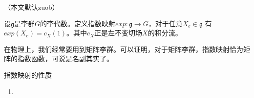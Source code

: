 
（本文默认zuob）
\begin{definition}{}
设$\mathfrak g$是李群$G$的李代数。定义指数映射$exp:\mathfrak g\to G$，对于任意$X_e\in \mathfrak g$ 有$exp(X_e)=c_X(1)$。其中$c_X$正是左不变切场$X$的积分流。
\end{definition}
在物理上，我们经常要用到矩阵李群。可以证明，对于矩阵李群，指数映射恰为矩阵的指数函数，可说是名副其实了。

\begin{theorem}{指数映射的性质}
\begin{enumerate}
\item 
\end{enumerate}
\end{theorem}

